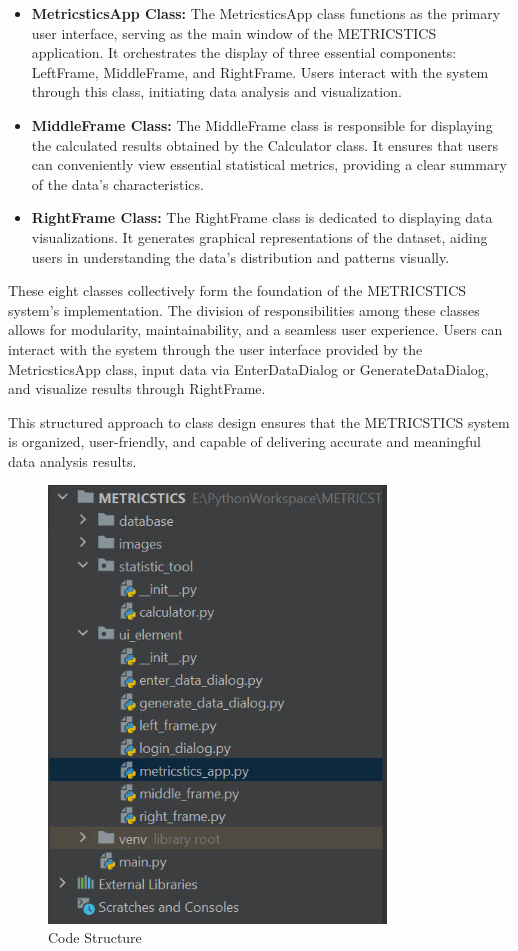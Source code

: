 \documentclass[english,12pt,a4paper]{report}
\begin{document}
\begin{itemize}[leftmargin=*]
		\item \textbf{MetricsticsApp Class:} The MetricsticsApp class functions as the primary user interface, serving as the main window of the METRICSTICS application. It orchestrates the display of three essential components: LeftFrame, MiddleFrame, and RightFrame. Users interact with the system through this class, initiating data analysis and visualization.
		
		\item \textbf{MiddleFrame Class:} The MiddleFrame class is responsible for displaying the calculated results obtained by the Calculator class. It ensures that users can conveniently view essential statistical metrics, providing a clear summary of the data's characteristics.
		
		\item \textbf{RightFrame Class:} The RightFrame class is dedicated to displaying data visualizations. It generates graphical representations of the dataset, aiding users in understanding the data's distribution and patterns visually.
	\end{itemize}
	These eight classes collectively form the foundation of the METRICSTICS system's implementation. The division of responsibilities among these classes allows for modularity, maintainability, and a seamless user experience. Users can interact with the system through the user interface provided by the MetricsticsApp class, input data via EnterDataDialog or GenerateDataDialog, and visualize results through RightFrame.
	
	This structured approach to class design ensures that the METRICSTICS system is organized, user-friendly, and capable of delivering accurate and meaningful data analysis results.
	
	\begin{figure}[H]
		\centering
		\includegraphics[width=0.8\textwidth]{images/code.jpg}
		\caption{Code Structure}
		\label{fig:Code Structure}
	\end{figure}
	
\end{document}
